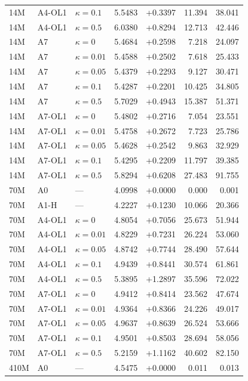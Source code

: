 \begin{table}[p]
\begin{tabular}{@{}lllrrrr@{}}
14M & A4-OL1 & $\kappa=0.1$ & 5.5483 & +0.3397 & 11.394 & 38.041 \\
14M & A4-OL1 & $\kappa=0.5$ & 6.0380 & +0.8294 & 12.713 & 42.446 \\
14M & A7 & $\kappa=0$ & 5.4684 & +0.2598 & 7.218 & 24.097 \\
14M & A7 & $\kappa=0.01$ & 5.4588 & +0.2502 & 7.618 & 25.433 \\
14M & A7 & $\kappa=0.05$ & 5.4379 & +0.2293 & 9.127 & 30.471 \\
14M & A7 & $\kappa=0.1$ & 5.4287 & +0.2201 & 10.425 & 34.805 \\
14M & A7 & $\kappa=0.5$ & 5.7029 & +0.4943 & 15.387 & 51.371 \\
14M & A7-OL1 & $\kappa=0$ & 5.4802 & +0.2716 & 7.054 & 23.551 \\
14M & A7-OL1 & $\kappa=0.01$ & 5.4758 & +0.2672 & 7.723 & 25.786 \\
14M & A7-OL1 & $\kappa=0.05$ & 5.4628 & +0.2542 & 9.863 & 32.929 \\
14M & A7-OL1 & $\kappa=0.1$ & 5.4295 & +0.2209 & 11.797 & 39.385 \\
14M & A7-OL1 & $\kappa=0.5$ & 5.8294 & +0.6208 & 27.483 & 91.755 \\
70M & A0 & --- & 4.0998 & +0.0000 & 0.000 & 0.001 \\
70M & A1-H & --- & 4.2227 & +0.1230 & 10.066 & 20.366 \\
70M & A4-OL1 & $\kappa=0$ & 4.8054 & +0.7056 & 25.673 & 51.944 \\
70M & A4-OL1 & $\kappa=0.01$ & 4.8229 & +0.7231 & 26.224 & 53.060 \\
70M & A4-OL1 & $\kappa=0.05$ & 4.8742 & +0.7744 & 28.490 & 57.644 \\
70M & A4-OL1 & $\kappa=0.1$ & 4.9439 & +0.8441 & 30.574 & 61.861 \\
70M & A4-OL1 & $\kappa=0.5$ & 5.3895 & +1.2897 & 35.596 & 72.022 \\
70M & A7-OL1 & $\kappa=0$ & 4.9412 & +0.8414 & 23.562 & 47.674 \\
70M & A7-OL1 & $\kappa=0.01$ & 4.9364 & +0.8366 & 24.226 & 49.017 \\
70M & A7-OL1 & $\kappa=0.05$ & 4.9637 & +0.8639 & 26.524 & 53.666 \\
70M & A7-OL1 & $\kappa=0.1$ & 4.9501 & +0.8503 & 28.694 & 58.056 \\
70M & A7-OL1 & $\kappa=0.5$ & 5.2159 & +1.1162 & 40.602 & 82.150 \\
410M & A0 & --- & 4.5475 & +0.0000 & 0.011 & 0.013 \\

\end{tabular}
\end{table}
